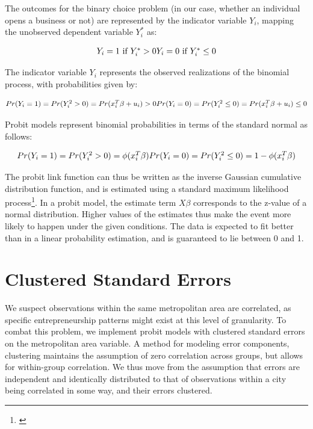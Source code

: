 The outcomes for the binary choice problem (in our case, whether an individual opens a business or not) are represented by the indicator variable $Y_i$, mapping the unobserved dependent variable $Y^*_i$ as:



\begin{dmath}
\mbox{$Y_i = 1 \mbox{ if } Y^{*}_{i}>0$} \\
\mbox{$Y_i = 0 \mbox{ if } Y^*_i\leq 0$}
\end{dmath}

The indicator variable $Y_i$ represents the observed realizations of the binomial process, with probabilities given by:

\begin{dmath}
\mbox{$Pr(Y_i = 1) = Pr(Y^2_i > 0) = Pr (x^T_i\beta + u_i) >0 $} \\
\mbox{$Pr(Y_i = 0) = Pr(Y^2_i \leq 0) = Pr (x^T_i\beta + u_i) \leq 0 $}
\end{dmath}

Probit models represent binomial probabilities in terms of the standard normal as follows:

\begin{dmath}
\mbox{$Pr(Y_i = 1) = Pr(Y^2_i > 0) = \phi(x^T_i\beta) $} \\
\mbox{$Pr(Y_i = 0) = Pr(Y^2_i \leq 0) = 1 - \phi(x^T_i\beta) $}
\end{dmath}

The probit link function can thus be written as the inverse Gaussian cumulative distribution function, and is estimated using a standard maximum likelihood process\footnote{\cite{AldrichNelson1984}}. In a probit model, the estimate term $X\beta$ corresponds to the z-value of a normal distribution. Higher values of the estimates thus make the event more likely to happen under the given conditions. The data is expected to fit better than in a linear probability estimation, and is guaranteed to lie between 0 and 1. 

\section{Clustered Standard Errors}

We suspect observations within the same metropolitan area are correlated, as specific entrepreneurship patterns might exist at this level of granularity. To combat this problem, we implement probit models with clustered standard errors on the metropolitan area variable. A method for modeling error components, clustering maintains the assumption of zero correlation across groups, but allows for within-group correlation. We thus move from the assumption that errors are independent and identically distributed to that of observations within a city being correlated in some way, and their errors clustered.

